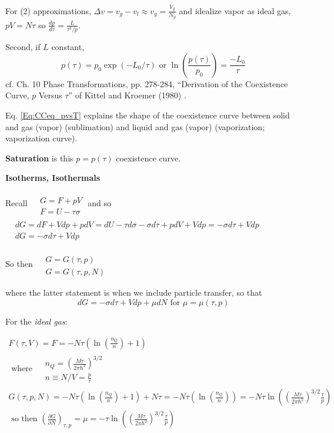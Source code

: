 \documentclass[10pt]{amsart}
\begin{document}
\begin{multicols*}{2}
For (2) approximations, $\Delta v = v_g - v_l \approx v_g = \frac{V_g}{N_g}$ and idealize vapor as ideal gas, $pV = N\tau$ so $\frac{dp}{d\tau} = \frac{L}{\tau^2/p}$.  

Second, if $L$ constant, 
\begin{equation}\label{Eq:CCeq_pvsT}
  p(\tau) = p_0 \exp{ (-L_0/\tau)} \text{ or } \ln{ \left( \frac{p(\tau)}{p_0} \right) } = \frac{-L_0}{\tau}
\end{equation}
cf. Ch. 10 Phase Transformations, pp. 278-284, ``Derivation of the Coexistence Curve, $p$ Versus $\tau$'' of Kittel and Kroemer (1980) \cite{CKittelHKroemer1980}.  

Eq. \ref{Eq:CCeq_pvsT} explains the shape of the coexistence curve between solid and gas (vapor) (sublimation) and liquid and gas (vapor) (vaporization; vaporization curve).  

\textbf{Saturation} is this $p=p(\tau)$ coexistence curve.  


\textbf{Isotherms, Isothermals}

Recall $\begin{aligned} 
  & \quad \\
  & G = F + pV \\
  & F = U-\tau \sigma \end{aligned}$ and so $\begin{aligned}
  & \quad \\
  & dG = dF + Vdp + pdV = dU - \tau d\sigma - \sigma d\tau + pdV + Vdp = -\sigma d\tau + Vdp \\
  & dG = -\sigma d\tau + Vdp \end{aligned}$

So then $\begin{aligned} & \quad \\
  & G = G(\tau, p) \\
  & G= G(\tau, p, N) \end{aligned}$ 

where the latter statement is when we include particle transfer, so that 
\[
dG = -\sigma d\tau + Vdp + \mu dN \text{ for } \mu = \mu(\tau,p)
\]

For the \emph{ideal gas}:

\[
\begin{gathered}
  F(\tau,V) = F= -N\tau \left( \ln{ \left( \frac{n_Q}{n} \right)} + 1 \right) \\ 
  \text{ where }  \begin{aligned}
    & n_Q = \left( \frac{M\tau }{2\pi \hbar^2 } \right)^{3/2} \\ 
    & n \equiv N/V = \frac{p}{\tau} 
  \end{aligned} \\
  G(\tau,p, N) = -N \tau ( \ln{ \left( \frac{n_Q}{n} \right) } + 1 ) + N \tau = - N\tau ( \ln{ \left( \frac{n_Q}{n} \right) } ) = -N\tau \ln{ \left( \left( \frac{M\tau}{2\pi \hbar^2 } \right)^{3/2} \frac{\tau}{p} \right) } \\
  \text{ so then }
\left( \frac{ \partial G}{ \partial N} \right)_{\tau,p} = \mu = -\tau \ln{ \left( \left( \frac{M\tau}{2\pi \hbar^2} \right)^{3/2} \frac{\tau}{p} \right) }
\end{gathered}
\]


\end{multicols*}
\end{document}
